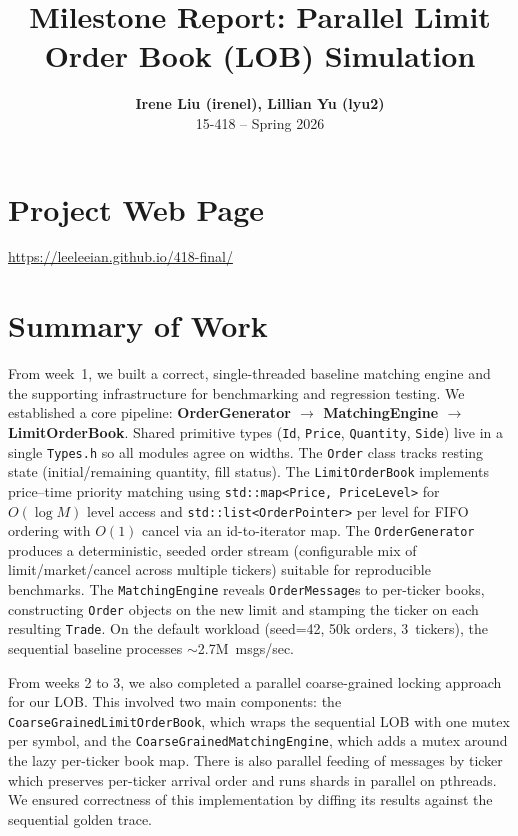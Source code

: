 \documentclass[11pt]{article}
\title{\textbf{Milestone Report: Parallel Limit Order Book (LOB) Simulation}}
\author{\textbf{Irene Liu (irenel), Lillian Yu (lyu2)} \\ 15-418 -- Spring 2026}
\date{}
\begin{document}
\maketitle

\section*{Project Web Page}
\url{https://leeleeian.github.io/418-final/}

\section*{Summary of Work}

From week~1, we built a correct, single-threaded baseline matching engine and the supporting infrastructure for benchmarking and regression testing. We established a core pipeline: \textbf{OrderGenerator $\rightarrow$ MatchingEngine $\rightarrow$ LimitOrderBook}. Shared primitive types (\texttt{Id}, \texttt{Price}, \texttt{Quantity}, \texttt{Side}) live in a single \texttt{Types.h} so all modules agree on widths. The \texttt{Order} class tracks resting state (initial/remaining quantity, fill status). The \texttt{LimitOrderBook} implements price--time priority matching using \texttt{std::map<Price, PriceLevel>} for $O(\log M)$ level access and \texttt{std::list<OrderPointer>} per level for FIFO ordering with $O(1)$ cancel via an id-to-iterator map. The \texttt{OrderGenerator} produces a deterministic, seeded order stream (configurable mix of limit/market/cancel across multiple tickers) suitable for reproducible benchmarks. The \texttt{MatchingEngine} reveals \texttt{OrderMessage}s to per-ticker books, constructing \texttt{Order} objects on the new limit and stamping the ticker on each resulting \texttt{Trade}. On the default workload (seed=42, 50k orders, 3~tickers), the sequential baseline processes $\sim$2.7M~msgs/sec.

From weeks 2 to 3, we also completed a parallel coarse-grained locking approach for our LOB. This involved two main components: the \texttt{CoarseGrainedLimitOrderBook}, which wraps the sequential LOB with one mutex per symbol, and the \texttt{CoarseGrainedMatchingEngine}, which adds a mutex around the lazy per-ticker book map. There is also parallel feeding of messages by ticker which preserves per-ticker arrival order and runs shards in parallel on pthreads. We ensured correctness of this implementation by diffing its results against the sequential golden trace.
\end{document}
